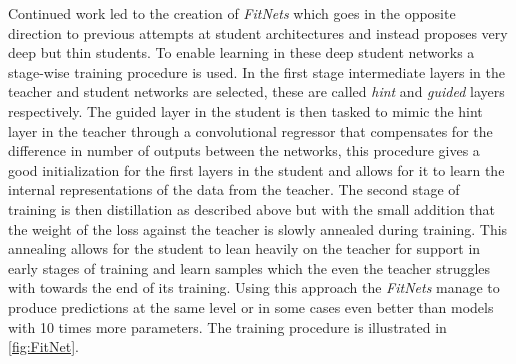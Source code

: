\documentclass{kththesis}
\newcommand{\bibentry}[1]{\parencite{#1}}
\begin{document}
Continued work led to the creation of \emph{FitNets}
\bibentry{romero2014fitnets} which goes in the opposite direction to previous
attempts at student architectures and instead proposes very deep but thin
students. To enable learning in these deep student networks a stage-wise
training procedure is used. In the first stage intermediate layers in the
teacher and student networks are selected, these are called \emph{hint} and
\emph{guided} layers respectively. The guided layer in the student is then
tasked to mimic the hint layer in the teacher through a convolutional regressor
that compensates for the difference in number of outputs between the networks,
this procedure gives a good initialization for the first layers in the student
and allows for it to learn the internal representations of the data from the
teacher. The second stage of training is then distillation as described above
but with the small addition that the weight of the loss against the teacher is
slowly annealed during training. This annealing allows for the student to lean
heavily on the teacher for support in early stages of training and learn samples
which the even the teacher struggles with towards the end of its training. Using
this approach the \emph{FitNets} manage to produce predictions at the same level
or in some cases even better than models with 10 times more parameters. The
training procedure is illustrated in \cref{fig:FitNet}.
\end{document}

